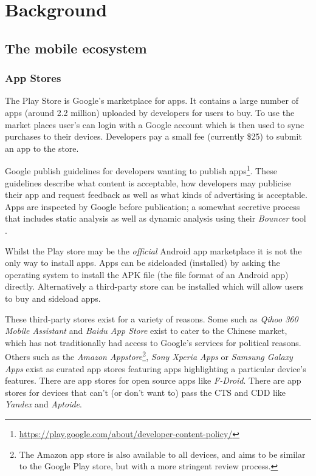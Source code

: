 \documentclass[thesis.tex]{subfiles}
\begin{document}
\chapter{Background}

\section{The mobile ecosystem}\label{sec:mobile-ecosystem}

\subsection{App Stores}\label{app-stores}

The Play Store is Google's marketplace for apps. It contains a large
number of apps (around 2.2 million) uploaded by developers for users to
buy. To use the market places user's can login with a Google account
which is then used to sync purchases to their devices. Developers pay a
small fee (currently \$25) to submit an app to the store.

Google publish guidelines for developers wanting to publish
apps\footnote{\url{https://play.google.com/about/developer-content-policy/}}.
These guidelines describe what content is acceptable, how developers may
publicise their app and request feedback as well as what kinds of
advertising is acceptable. Apps are inspected by Google before
publication; a somewhat secretive process that includes static analysis
as well as dynamic analysis using their \emph{Bouncer} tool
\cite{oberheide_dissecting_2012}.

Whilst the Play store may be the \emph{official} Android app marketplace
it is not the only way to install apps. Apps can be sideloaded
(installed) by asking the operating system to install the APK file (the
file format of an Android app) directly. Alternatively a third-party
store can be installed which will allow users to buy and sideload apps.

These third-party stores exist for a variety of reasons. Some such as
\emph{Qihoo 360 Mobile Assistant} and \emph{Baidu App Store} exist to cater to
the Chinese market, which has not traditionally had access to Google's services
for political reasons. Others such as the \emph{Amazon Appstore}\footnote{The
Amazon app store is also available to all devices, and aims to be similar to the
Google Play store, but with a more stringent review process.}, \emph{Sony Xperia
Apps} or \emph{Samsung Galaxy Apps} exist as curated app stores featuring apps
highlighting a particular device's features. There are app stores for open
source apps like \emph{F-Droid}. There are app stores for devices that can't (or
don't want to) pass the CTS and CDD like \emph{Yandex} and \emph{Aptoide}.
\end{document}
